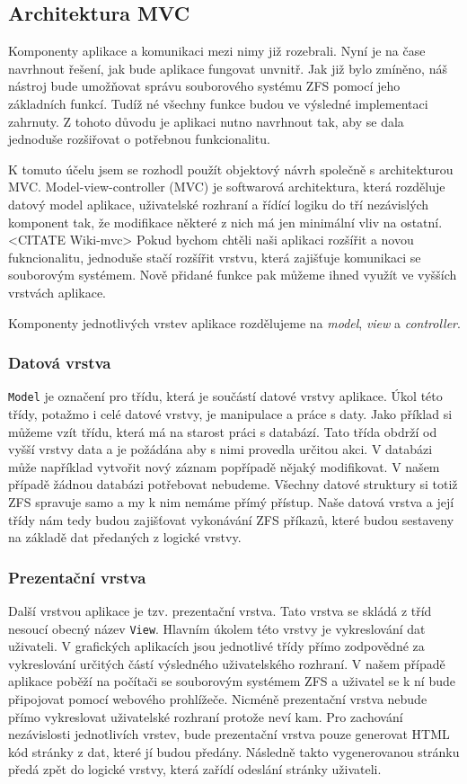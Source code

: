     \subsection{Architektura MVC}
    Komponenty aplikace a komunikaci mezi nimy již rozebrali. Nyní je na čase navrhnout řešení, jak bude aplikace fungovat unvnitř. Jak již bylo zmíněno, náš nástroj bude umožňovat správu souborového systému ZFS pomocí jeho základních funkcí. Tudíž né všechny funkce budou ve výsledné implementaci zahrnuty. Z tohoto důvodu je aplikaci nutno navrhnout tak, aby se dala jednoduše rozšiřovat o potřebnou funkcionalitu.

    K tomuto účelu jsem se rozhodl použít objektový návrh společně s architekturou MVC. Model-view-controller (MVC) je softwarová architektura, která rozděluje datový model aplikace, uživatelské rozhraní a řídící logiku do tří nezávislých komponent tak, že modifikace některé z nich má jen minimální vliv na ostatní.<CITATE Wiki-mvc> Pokud bychom chtěli naši aplikaci rozšířit a novou fukncionalitu, jednoduše stačí rozšířit vrstvu, která zajišťuje komunikaci se souborovým systémem. Nově přidané funkce pak můžeme ihned využít ve vyšších vrstvách aplikace.

    Komponenty jednotlivých vrstev aplikace rozdělujeme na \emph{model}, \emph{view} a \emph{controller}.

        \subsubsection{Datová vrstva}
        \verb|Model| je označení pro třídu, která je součástí datové vrstvy aplikace. Úkol této třídy, potažmo i celé datové vrstvy, je manipulace a práce s daty. Jako příklad si můžeme vzít třídu, která má na starost práci s databází. Tato třída obdrží od vyšší vrstvy data a je požádána aby s nimi provedla určitou akci. V databázi může například vytvořit nový záznam popřípadě nějaký modifikovat. V našem případě žádnou databázi potřebovat nebudeme. Všechny datové struktury si totiž ZFS spravuje samo a my k nim nemáme přímý přístup. Naše datová vrstva a její třídy nám tedy budou zajišťovat vykonávání ZFS příkazů, které budou sestaveny na základě dat předaných z logické vrstvy.
        \subsubsection{Prezentační vrstva}
        Další vrstvou aplikace je tzv. prezentační vrstva. Tato vrstva se skládá z tříd nesoucí obecný název \verb|View|. Hlavním úkolem této vrstvy je vykreslování dat uživateli. V grafických aplikacích jsou jednotlivé třídy přímo zodpovědné za vykreslování určitých částí výsledného uživatelského rozhraní. V našem případě aplikace poběží na počítači se souborovým systémem ZFS a uživatel se k ní bude připojovat pomocí webového prohlížeče. Nicméně prezentační vrstva nebude přímo vykreslovat uživatelské rozhraní protože neví kam. Pro zachování nezávislosti jednotlivích vrstev, bude prezentační vrstva pouze generovat HTML kód stránky z dat, které jí budou předány. Následně takto vygenerovanou stránku předá zpět do logické vrstvy, která zařídí odeslání stránky uživateli.
